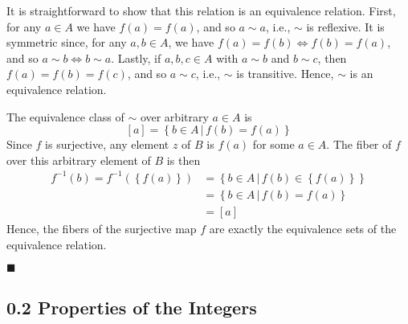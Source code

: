 \documentclass[12pt]{article}
\renewcommand{\qed}{\hfill$\blacksquare$}
\renewenvironment{proof}{\begin{addmargin}[1em]{0em}\begin{newproof}}{\end{newproof}\end{addmargin}\qed}
\begin{document}
\begin{proof}
It is straightforward to show that this relation is an equivalence relation. First, for any $a\in A$ we have $f\left(a\right)=f\left(a\right)$, and so $a\sim a$, i.e., $\sim$ is reflexive. It is symmetric since, for any $a,b\in A$, we have $f\left(a\right)=f\left(b\right) \iff f\left(b\right)=f\left(a\right)$, and so $a\sim b \iff b\sim a$. Lastly, if $a,b,c\in A$ with $a\sim b$ and $b\sim c$, then $f\left(a\right) = f\left(b\right) = f\left(c\right)$, and so $a\sim c$, i.e., $\sim$ is transitive. Hence, $\sim$ is an equivalence relation.

The equivalence class of $\sim$ over arbitrary $a\in A$ is
$$ \left[a\right] = \left\{ b\in A \, | \, f\left(b\right)=f\left(a\right) \right\} $$
Since $f$ is surjective, any element $z$ of $B$ is $f\left(a\right)$ for some $a\in A$. The fiber of $f$ over this arbitrary element of $B$ is then
\begin{equation*} \begin{split}f^{-1}\left(b\right)= f^{-1}\left(\left\{ f\left(a\right) \right\} \right) & = \left\{ b\in A \, | \, f\left(b\right) \in \left\{ f\left(a\right) \right\} \right\} \\
& = \left\{ b\in A \, | \, f\left(b\right) = f\left(a\right) \right\} \\
& = \left[a\right]
\end{split}\end{equation*}
Hence, the fibers of the surjective map $f$ are exactly the equivalence sets of the equivalence relation.
\end{proof}





\subsection*{0.2 Properties of the Integers}
\end{document}
